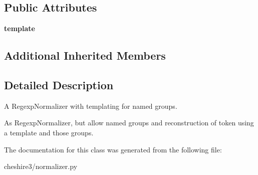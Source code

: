 \subsection*{Public Attributes}
\begin{DoxyCompactItemize}
\item 
\hypertarget{classcheshire3_1_1normalizer_1_1_named_regexp_normalizer_a721f66861675ea9145e4825a2a081485}{{\bfseries template}}\label{classcheshire3_1_1normalizer_1_1_named_regexp_normalizer_a721f66861675ea9145e4825a2a081485}

\end{DoxyCompactItemize}
\subsection*{Additional Inherited Members}


\subsection{Detailed Description}
\begin{DoxyVerb}A RegexpNormalizer with templating for named groups.

As RegexpNormalizer, but allow named groups and reconstruction of token
using a template and those groups.
\end{DoxyVerb}
 

The documentation for this class was generated from the following file\-:\begin{DoxyCompactItemize}
\item 
cheshire3/normalizer.\-py\end{DoxyCompactItemize}
